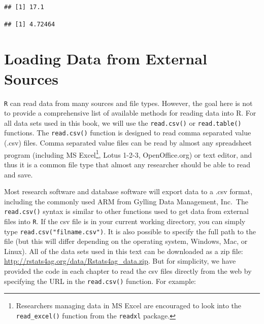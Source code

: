 \documentclass[letterpaper,]{book}
\newenvironment{Shaded}{\begin{snugshade}}{\end{snugshade}}
\newcommand{\KeywordTok}[1]{\textcolor[rgb]{0.13,0.29,0.53}{\textbf{#1}}}
\newcommand{\NormalTok}[1]{#1}
\newcommand{\OperatorTok}[1]{\textcolor[rgb]{0.81,0.36,0.00}{\textbf{#1}}}
\begin{document}
\begin{Shaded}
\end{Shaded}

\begin{verbatim}
## [1] 17.1
\end{verbatim}

\begin{Shaded}
\end{Shaded}

\begin{verbatim}
## [1] 4.72464
\end{verbatim}

\hypertarget{loading-data-from-external-sources}{%
\section{Loading Data from External Sources}\label{loading-data-from-external-sources}}

\texttt{R} can read data from many sources and file types. However, the goal here is not to provide a comprehensive list of available methods for reading data into R. For all data sets used in this book, we will use the \texttt{read.csv()} or \texttt{read.table()} functions. The \texttt{read.csv()} function is designed to read comma separated value (.csv) files. Comma separated value files can be read by almost any spreadsheet program (including MS Excel\footnote{Researchers managing data in MS Excel are encouraged to look into the \texttt{read\_excel()} function from the \texttt{readxl} package.}, Lotus 1-2-3, OpenOffice.org) or text editor, and thus it is a common file type that almost any researcher should be able to read and save.

Most research software and database software will export data to a .csv format, including the commonly used ARM from Gylling Data Management, Inc.~The \texttt{read.csv()} syntax is similar to other functions used to get data from external files into \texttt{R}. If the csv file is in your current working directory, you can simply type \texttt{read.csv("filname.csv")}. It is also possible to specify the full path to the file (but this will differ depending on the operating system, Windows, Mac, or Linux). All of the data sets used in this text can be downloaded as a zip file: \url{http://rstats4ag.org/data/Rstats4ag_data.zip}. But for simplicity, we have provided the code in each chapter to read the csv files directly from the web by specifying the URL in the \texttt{read.csv()} function. For example:
\end{document}
